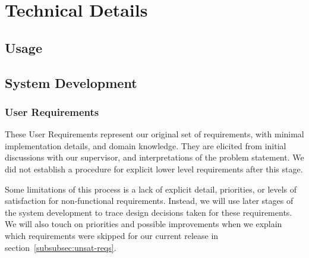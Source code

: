 \documentclass[11pt]{article}
\begin{document}
    \section{Technical Details}\label{sec:technical-details}
    \subsection{Usage}\label{subsec:usage}

    \subsection{System Development}

    \label{subsec:system-development}
    \subsubsection{User Requirements}

    These User Requirements represent our original set of requirements, with minimal implementation details, and domain knowledge.
    They are elicited from initial discussions with our supervisor,
    and interpretations of the problem statement.
    We did not establish a procedure for explicit lower level requirements after this stage.

    Some limitations of this process is a lack of explicit detail, priorities, or levels of satisfaction for non-functional requirements.
    Instead, we will use later stages of the system development to trace design decisions taken for these requirements.
    We will also touch on priorities and possible improvements when we explain
    which requirements were skipped for our current release in section~\ref{subsubsec:unsat-reqs}.
\end{document}
